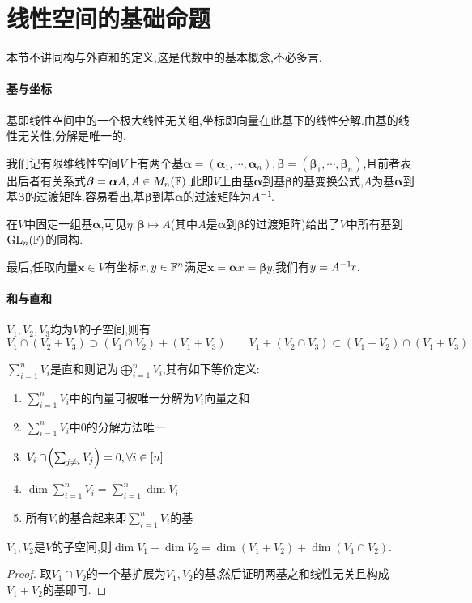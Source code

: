 \documentclass[openany]{book}
\begin{document}
\section{线性空间的基础命题}
本节不讲同构与外直和的定义,这是代数中的基本概念,不必多言.
\paragraph{基与坐标}
基即线性空间中的一个极大线性无关组,坐标即向量在此基下的线性分解.由基的线性无关性,分解是唯一的.

我们记有限维线性空间$V$上有两个基$\bm{\alpha}=(\bm{\alpha}_1,\cdots,\bm{\alpha}_n),\bm{\beta}=(\bm{\beta}_1,\cdots,\bm{\beta}_n)$,且前者表出后者有关系式$\bm{\beta}=\bm{\alpha}A,A\in M_n(\mathbb{F})$,此即$V$上由基$\bm{\alpha}$到基$\bm{\beta}$的基变换公式,$A$为基$\bm{\alpha}$到基$\bm{\beta}$的过渡矩阵.容易看出,基$\bm{\beta}$到基$\bm{\alpha}$的过渡矩阵为$A^{-1}\!$.

在$V$中固定一组基$\bm{\alpha}$,可见$\eta:\bm{\beta}\mapsto A$(其中$A$是$\bm{\alpha}$到$\bm{\beta}$的过渡矩阵)给出了$V$中所有基到$\operatorname{GL}_n(\mathbb{F})$的同构.

最后,任取向量$\bm{x}\in V$有坐标$x,y\in \mathbb{F}^n$满足$\bm{x}=\bm{\alpha}x=\bm{\beta}y$,我们有$y=A^{-1}\! x$.


\paragraph{和与直和}
\begin{proposition}
    $V_1,V_2,V_3$均为$V$的子空间,则有
    $$V_1\cap(V_2+V_3)\supset (V_1\cap V_2)+(V_1+V_3)\qquad V_1+(V_2\cap V_3)\subset (V_1+V_2)\cap(V_1+V_3)$$
\end{proposition}
\begin{definition}[直和]
    $\sum_{i=1}^n V_i$是直和则记为$\bigoplus_{i=1}^n V_i$,其有如下等价定义:
    \begin{enumerate}
        \item $\sum_{i=1}^n V_i$中的向量可被唯一分解为$V_i$向量之和
        \item $\sum_{i=1}^n V_i$中0的分解方法唯一
        \item $V_i\cap\!\left(\sum_{j\neq i}V_j\right)=0,\forall i\in [n]$
        \item $\dim \sum_{i=1}^n V_i=\sum_{i=1}^n \dim V_i$
        \item 所有$V_i$的基合起来即$\sum_{i=1}^n V_i$的基
    \end{enumerate}
\end{definition}
\begin{theorem}
    $V_1,V_2$是$V$的子空间,则$\dim V_1+\dim V_2=\dim (V_1+V_2)+\dim (V_1\cap V_2)$.
\end{theorem}
\begin{proof}
    取$V_1\cap V_2$的一个基扩展为$V_1,V_2$的基,然后证明两基之和线性无关且构成$V_1+V_2$的基即可.
\end{proof}
\end{document}
